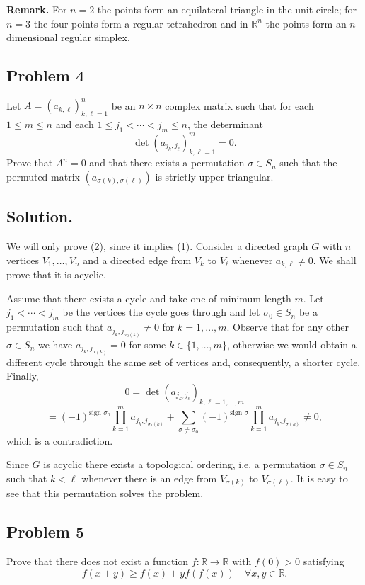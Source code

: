 \documentclass{article}
\begin{document}
\textbf{Remark.} For $n=2$ the points form an equilateral triangle in the unit circle; for $n=3$ the four points form a regular tetrahedron and in $\mathbb{R}^n$ the points form an $n$-dimensional regular simplex.

\subsection*{Problem 4}
Let $A = (a_{k,\ell})_{k,\ell=1}^n$ be an $n \times n$ complex matrix such that for each $1 \leq m \leq n$ and each $1 \leq j_1 < \cdots < j_m \leq n$, the determinant
\[
\det(a_{j_k, j_\ell})_{k,\ell=1}^m = 0.
\]
Prove that $A^n = 0$ and that there exists a permutation $\sigma \in S_n$ such that the permuted matrix $(a_{\sigma(k), \sigma(\ell)})$ is strictly upper-triangular.

\subsection*{Solution.}
We will only prove (2), since it implies (1). Consider a directed graph $G$ with $n$ vertices $V_1, \ldots, V_n$ and a directed edge from $V_k$ to $V_\ell$ whenever $a_{k,\ell} \neq 0$. We shall prove that it is acyclic.

Assume that there exists a cycle and take one of minimum length $m$.
Let $j_1 < \cdots < j_m$ be the vertices the cycle goes through and let $\sigma_0 \in S_n$ be a permutation
such that $a_{j_k, j_{\sigma_0(k)}} \neq 0$ for $k=1,\ldots,m$.
Observe that for any other $\sigma \in S_n$ we have $a_{j_k, j_{\sigma(k)}} = 0$ for some $k \in \{1,\ldots,m\}$,
otherwise we would obtain a different cycle through the same set of vertices and, consequently, a shorter cycle.
Finally,
\[
0 = \det(a_{j_k,j_\ell})_{k,\ell=1,\ldots,m}
\]
\[
= (-1)^{\text{sign } \sigma_0} \prod_{k=1}^m a_{j_k, j_{\sigma_0(k)}} + \sum_{\sigma \neq \sigma_0} (-1)^{\text{sign } \sigma} \prod_{k=1}^m a_{j_k, j_{\sigma(k)}} \neq 0,
\]
which is a contradiction.

Since $G$ is acyclic there exists a topological ordering,
i.e. a permutation $\sigma \in S_n$ such that $k < \ell$ whenever there is an edge
from $V_{\sigma(k)}$ to $V_{\sigma(\ell)}$. It is easy to see that this permutation solves the problem.

\subsection*{Problem 5}
Prove that there does not exist a function $f : \mathbb{R} \to \mathbb{R}$ with $f(0) > 0$ satisfying
\[
f(x+y) \geq f(x) + y f(f(x)) \quad \forall x,y \in \mathbb{R}.
\]
\end{document}
